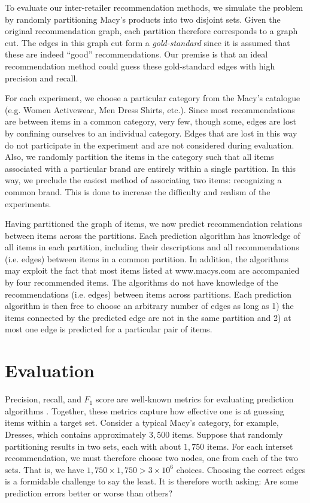 \documentclass[11pt]{article}
\begin{document}
To evaluate our inter-retailer recommendation methods, we simulate the problem
by randomly partitioning Macy's products into two disjoint sets. Given the
original recommendation graph, each partition therefore corresponds to a graph
cut. The edges in this graph cut form a {\em gold-standard} since it is assumed
that these are indeed ``good'' recommendations. Our premise is that an ideal
recommendation method could guess these gold-standard edges with high precision
and recall.

For each experiment, we choose a particular category from the Macy's catalogue
(e.g. Women Activewear, Men Dress Shirts, etc.). Since most recommendations are
between items in a common category, very few, though some, edges are lost by
confining ourselves to an individual category. Edges that are lost in this way
do not participate in the experiment and are not considered during evaluation.
Also, we randomly partition the items in the category such that all items
associated with a particular brand are entirely within a single partition. In
this way, we preclude the easiest method of associating two items: recognizing
a common brand. This is done to increase the difficulty and realism of the
experiments.

Having partitioned the graph of items, we now predict recommendation relations
between items across the partitions. Each prediction algorithm has knowledge of
all items in each partition, including their descriptions and all
recommendations (i.e.  edges) between items in a common partition. In addition,
the algorithms may exploit the fact that most items listed at www.macys.com are
accompanied by four recommended items. The algorithms do not have knowledge of
the recommendations (i.e. edges) between items across partitions. Each
prediction algorithm is then free to choose an arbitrary number of edges as long
as 1) the items connected by the predicted edge are not in the same partition
and 2) at most one edge is predicted for a particular pair of items.

\section*{Evaluation}
Precision, recall, and $F_1$ score are well-known metrics for evaluating
prediction algorithms \cite{Powers2011}. Together, these metrics capture how
effective one is at guessing items within a target set. Consider a typical
Macy's category, for example, Dresses, which contains approximately $3,500$
items. Suppose that randomly partitioning results in two sets, each with about
$1,750$ items. For each interset recommendation, we must therefore choose two
nodes, one from each of the two sets. That is, we have $1,750 \times 1,750 > 3
\times 10^6$ choices. Choosing the correct edges is a formidable challenge to
say the least. It is therefore worth asking: Are some prediction errors better
or worse than others?
\end{document}
